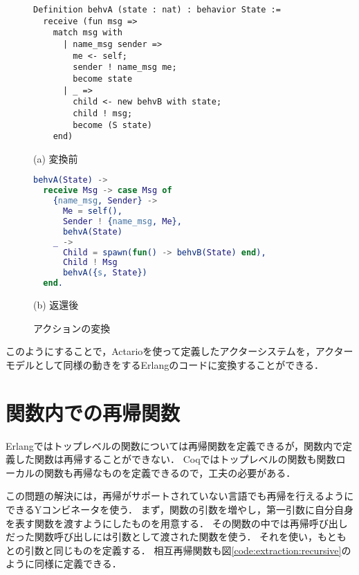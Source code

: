 \begin{figure}\centering
\begin{minipage}{1\textwidth}\centering
\begin{lstlisting}[frame=single,numbers=none,xleftmargin=0pt]
Definition behvA (state : nat) : behavior State :=
  receive (fun msg =>
    match msg with
      | name_msg sender =>
        me <- self;
        sender ! name_msg me;
        become state
      | _ =>
        child <- new behvB with state;
        child ! msg;
        become (S state)
    end)
\end{lstlisting}
(a) 変換前
\end{minipage}
\begin{minipage}{1\textwidth}\centering
\begin{lstlisting}[frame=single,numbers=none,xleftmargin=0pt,language=Erlang]
behvA(State) ->
  receive Msg -> case Msg of
    {name_msg, Sender} ->
      Me = self(),
      Sender ! {name_msg, Me},
      behvA(State)
    _ ->
      Child = spawn(fun() -> behvB(State) end),
      Child ! Msg
      behvA({s, State})
  end.
\end{lstlisting}
(b) 返還後
\end{minipage}
\caption{アクションの変換}\label{code:extraction:action}
\end{figure}

このようにすることで，Actarioを使って定義したアクターシステムを，アクターモデルとして同様の動きをするErlangのコードに変換することができる．

\section{関数内での再帰関数}

Erlangではトップレベルの関数については再帰関数を定義できるが，関数内で定義した関数は再帰することができない．
Coqではトップレベルの関数も関数ローカルの関数も再帰なものを定義できるので，工夫の必要がある．

この問題の解決には，再帰がサポートされていない言語でも再帰を行えるようにできるYコンビネータを使う．
まず，関数の引数を増やし，第一引数に自分自身を表す関数を渡すようにしたものを用意する．
その関数の中では再帰呼び出しだった関数呼び出しには引数として渡された関数を使う．
それを使い，もともとの引数と同じものを定義する．
相互再帰関数も図\ref{code:extraction:recursive}のように同様に定義できる．

